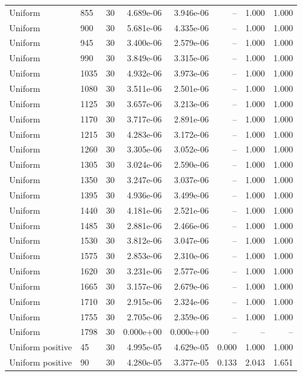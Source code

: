 \begin{scriptsize}
\begin{longtable}{llrrrrrr}
Uniform & 855 & 30 & 4.689e-06 & 3.946e-06 & -- & 1.000 & 1.000 \\
Uniform & 900 & 30 & 5.681e-06 & 4.335e-06 & -- & 1.000 & 1.000 \\
Uniform & 945 & 30 & 3.400e-06 & 2.579e-06 & -- & 1.000 & 1.000 \\
Uniform & 990 & 30 & 3.849e-06 & 3.315e-06 & -- & 1.000 & 1.000 \\
Uniform & 1035 & 30 & 4.932e-06 & 3.973e-06 & -- & 1.000 & 1.000 \\
Uniform & 1080 & 30 & 3.511e-06 & 2.501e-06 & -- & 1.000 & 1.000 \\
Uniform & 1125 & 30 & 3.657e-06 & 3.213e-06 & -- & 1.000 & 1.000 \\
Uniform & 1170 & 30 & 3.717e-06 & 2.891e-06 & -- & 1.000 & 1.000 \\
Uniform & 1215 & 30 & 4.283e-06 & 3.172e-06 & -- & 1.000 & 1.000 \\
Uniform & 1260 & 30 & 3.305e-06 & 3.052e-06 & -- & 1.000 & 1.000 \\
Uniform & 1305 & 30 & 3.024e-06 & 2.590e-06 & -- & 1.000 & 1.000 \\
Uniform & 1350 & 30 & 3.247e-06 & 3.037e-06 & -- & 1.000 & 1.000 \\
Uniform & 1395 & 30 & 4.936e-06 & 3.499e-06 & -- & 1.000 & 1.000 \\
Uniform & 1440 & 30 & 4.181e-06 & 2.521e-06 & -- & 1.000 & 1.000 \\
Uniform & 1485 & 30 & 2.881e-06 & 2.466e-06 & -- & 1.000 & 1.000 \\
Uniform & 1530 & 30 & 3.812e-06 & 3.047e-06 & -- & 1.000 & 1.000 \\
Uniform & 1575 & 30 & 2.853e-06 & 2.310e-06 & -- & 1.000 & 1.000 \\
Uniform & 1620 & 30 & 3.231e-06 & 2.577e-06 & -- & 1.000 & 1.000 \\
Uniform & 1665 & 30 & 3.157e-06 & 2.679e-06 & -- & 1.000 & 1.000 \\
Uniform & 1710 & 30 & 2.915e-06 & 2.324e-06 & -- & 1.000 & 1.000 \\
Uniform & 1755 & 30 & 2.705e-06 & 2.359e-06 & -- & 1.000 & 1.000 \\
Uniform & 1798 & 30 & 0.000e+00 & 0.000e+00 & -- & -- & -- \\
Uniform positive & 45 & 30 & 4.995e-05 & 4.629e-05 & 0.000 & 1.000 & 1.000 \\
Uniform positive & 90 & 30 & 4.280e-05 & 3.377e-05 & 0.133 & 2.043 & 1.651 \\

\end{longtable}
\end{scriptsize}
